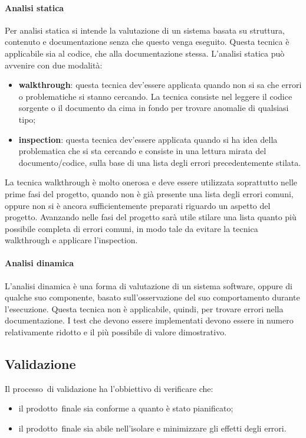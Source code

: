 \documentclass[../NormeProgetto.text]{subfiles}
\begin{document}
				\paragraph{Analisi statica} 
					Per analisi statica si intende la valutazione di un sistema basata su struttura, contenuto e documentazione senza che questo venga eseguito. Questa tecnica è applicabile sia al codice, che alla documentazione stessa. L'analisi statica può avvenire con due modalità:
					\begin{itemize}
						\item \textbf{walkthrough}: questa tecnica dev'essere applicata quando non si sa che errori o problematiche si stanno cercando. La tecnica consiste nel leggere il codice sorgente o il documento da cima in fondo per trovare anomalie  di qualsiasi tipo;
						\item \textbf{inspection}: questa tecnica dev'essere applicata quando si ha idea della problematica che si sta cercando e consiste in una lettura mirata del documento/codice, sulla base di una lista degli errori precedentemente stilata.
					\end{itemize}
					La tecnica walkthrough è molto onerosa e deve essere utilizzata soprattutto nelle prime fasi del progetto, quando non è già presente una lista degli errori comuni, oppure non si è ancora sufficientemente preparati riguardo un aspetto del progetto. Avanzando nelle fasi del progetto sarà utile stilare una lista quanto più possibile completa di errori comuni, in modo tale da evitare la tecnica walkthrough e applicare l'inspection.
				
				\paragraph{Analisi dinamica}
					L'analisi dinamica è una forma di valutazione di un sistema software\g, oppure di qualche suo componente, basato sull'osservazione del suo comportamento durante l'esecuzione. Questa tecnica non è applicabile, quindi, per trovare errori nella documentazione. I test che devono essere implementati devono essere in numero relativamente ridotto e il più possibile di valore dimostrativo.	
			
			
			
		
	
\subsection{Validazione}
		Il processo\g\ di validazione ha l'obbiettivo di verificare che: 
		\begin{itemize}
			\item il prodotto\g\ finale sia conforme a quanto è stato pianificato;
			\item il prodotto\g\ finale sia abile nell'isolare e minimizzare gli effetti degli errori.
		\end{itemize}
\end{document}
